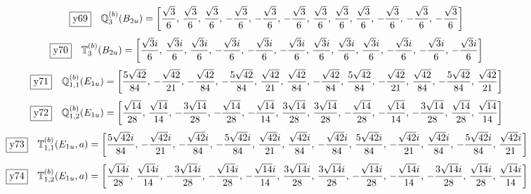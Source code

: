 \documentclass[fleqn,10pt,landscape]{jsarticle}
\begin{document}
\begin{dmath*}
\fbox{y69}\quad \mathbb{Q}_{3}^{(b)}(B_{2u})=\left[ \frac{\sqrt{3}}{6},\, \frac{\sqrt{3}}{6},\, \frac{\sqrt{3}}{6},\, - \frac{\sqrt{3}}{6},\, - \frac{\sqrt{3}}{6},\, - \frac{\sqrt{3}}{6},\, \frac{\sqrt{3}}{6},\, \frac{\sqrt{3}}{6},\, \frac{\sqrt{3}}{6},\, - \frac{\sqrt{3}}{6},\, - \frac{\sqrt{3}}{6},\, - \frac{\sqrt{3}}{6} \right]
\end{dmath*}
\begin{dmath*}
\fbox{y70}\quad \mathbb{T}_{3}^{(b)}(B_{2u})=\left[ \frac{\sqrt{3} i}{6},\, \frac{\sqrt{3} i}{6},\, \frac{\sqrt{3} i}{6},\, - \frac{\sqrt{3} i}{6},\, - \frac{\sqrt{3} i}{6},\, - \frac{\sqrt{3} i}{6},\, \frac{\sqrt{3} i}{6},\, \frac{\sqrt{3} i}{6},\, \frac{\sqrt{3} i}{6},\, - \frac{\sqrt{3} i}{6},\, - \frac{\sqrt{3} i}{6},\, - \frac{\sqrt{3} i}{6} \right]
\end{dmath*}
\begin{dmath*}
\fbox{y71}\quad \mathbb{Q}_{1,1}^{(b)}(E_{1u})=\left[ \frac{5 \sqrt{42}}{84},\, - \frac{\sqrt{42}}{21},\, - \frac{\sqrt{42}}{84},\, - \frac{5 \sqrt{42}}{84},\, \frac{\sqrt{42}}{21},\, \frac{\sqrt{42}}{84},\, - \frac{\sqrt{42}}{84},\, \frac{5 \sqrt{42}}{84},\, - \frac{\sqrt{42}}{21},\, \frac{\sqrt{42}}{84},\, - \frac{5 \sqrt{42}}{84},\, \frac{\sqrt{42}}{21} \right]
\end{dmath*}
\begin{dmath*}
\fbox{y72}\quad \mathbb{Q}_{1,2}^{(b)}(E_{1u})=\left[ \frac{\sqrt{14}}{28},\, \frac{\sqrt{14}}{14},\, - \frac{3 \sqrt{14}}{28},\, - \frac{\sqrt{14}}{28},\, - \frac{\sqrt{14}}{14},\, \frac{3 \sqrt{14}}{28},\, \frac{3 \sqrt{14}}{28},\, - \frac{\sqrt{14}}{28},\, - \frac{\sqrt{14}}{14},\, - \frac{3 \sqrt{14}}{28},\, \frac{\sqrt{14}}{28},\, \frac{\sqrt{14}}{14} \right]
\end{dmath*}
\begin{dmath*}
\fbox{y73}\quad \mathbb{T}_{1,1}^{(b)}(E_{1u},a)=\left[ \frac{5 \sqrt{42} i}{84},\, - \frac{\sqrt{42} i}{21},\, - \frac{\sqrt{42} i}{84},\, - \frac{5 \sqrt{42} i}{84},\, \frac{\sqrt{42} i}{21},\, \frac{\sqrt{42} i}{84},\, - \frac{\sqrt{42} i}{84},\, \frac{5 \sqrt{42} i}{84},\, - \frac{\sqrt{42} i}{21},\, \frac{\sqrt{42} i}{84},\, - \frac{5 \sqrt{42} i}{84},\, \frac{\sqrt{42} i}{21} \right]
\end{dmath*}
\begin{dmath*}
\fbox{y74}\quad \mathbb{T}_{1,2}^{(b)}(E_{1u},a)=\left[ \frac{\sqrt{14} i}{28},\, \frac{\sqrt{14} i}{14},\, - \frac{3 \sqrt{14} i}{28},\, - \frac{\sqrt{14} i}{28},\, - \frac{\sqrt{14} i}{14},\, \frac{3 \sqrt{14} i}{28},\, \frac{3 \sqrt{14} i}{28},\, - \frac{\sqrt{14} i}{28},\, - \frac{\sqrt{14} i}{14},\, - \frac{3 \sqrt{14} i}{28},\, \frac{\sqrt{14} i}{28},\, \frac{\sqrt{14} i}{14} \right]
\end{dmath*}
\end{document}
